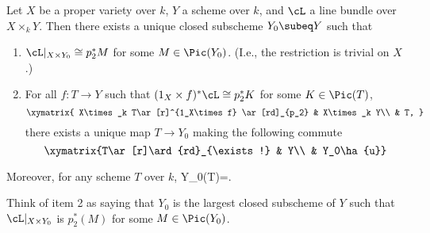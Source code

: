\begin{thm}
Let $X$ be a proper variety over $k$, $Y$ a scheme over $k$, and $\cL$ a line bundle over $X\times_k Y$. Then there exists a unique closed subscheme $Y_0\subeq Y$ such that 
\begin{enumerate}
\item
$\cL|_{X\times Y_0}\cong p_2^*M$ for some $M\in \Pic(Y_0)$. 
(I.e., the restriction is trivial on $X$.)
\item
For all $f:T\to Y$ such that $(1_X\times f)^*\cL\cong p_2^* K$ for some $K\in \Pic(T)$, 
\[
\xymatrix{
X\times_k T\ar[r]^{1_X\times f} \ar[rd]_{p_2} & X\times_k Y\\
& T,
}
\]
there exists a unique map $T\to Y_0$ making the following commute
\[
\xymatrix{T\ar[r]\ard{rd}_{\exists!} & Y\\ & Y_0\ha{u}}
\]
\end{enumerate}
Moreover, for any scheme $T$ over $k$,
Y_0(T)=.
\eeq
\end{thm}

Think of item 2 as saying that $Y_0$ is the largest closed subscheme of $Y$ such that $\cL|_{X\times Y_0}$ is $p^*_2(M)$ for some $M\in \Pic(Y_0)$.

